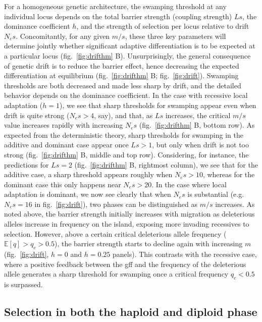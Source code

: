 \documentclass[
  11pt,
]{article}
\begin{document}
For a homogeneous genetic architecture, the swamping threshold at any
individual locus depends on the total barrier strength (coupling
strength) \(Ls\), the dominance coefficient \(h\), and the strength of
selection per locus relative to drift \(N_es\). Concomitantly, for any
given \(m/s\), these three key parameters will determine jointly whether
significant adaptive differentiation is to be expected at a particular
locus (fig.~\ref{fig:drifthm} B). Unsurprisingly, the general
consequence of genetic drift is to reduce the barrier effect, hence
decreasing the expected differentiation at equilibrium
(fig.~\ref{fig:drifthm} B; fig.~\ref{fig:drift}). Swamping thresholds
are both decreased and made less sharp by drift, and the detailed
behavior depends on the dominance coefficient. In the case with
recessive local adaptation (\(h=1\)), we see that sharp thresholds for
swamping appear even when drift is quite strong (\(N_es > 4\), say), and
that, as \(Ls\) increases, the critical \(m/s\) value increases rapidly
with increasing \(N_es\) (fig.~\ref{fig:drifthm} B, bottom row). As
expected from the deterministic theory, sharp thresholds for swamping in
the additive and dominant case appear once \(Ls > 1\), but only when
drift is not too strong (fig.~\ref{fig:drifthm} B, middle and top row).
Considering, for instance, the predictions for \(Ls = 2\)
(fig.~\ref{fig:drifthm} B, rightmost column), we see that for the
additive case, a sharp threshold appears roughly when \(N_es > 10\),
whereas for the dominant case this only happens near \(N_es > 20\). In
the case where local adaptation is dominant, we now see clearly that
when \(N_es\) is substantial (e.g.~\(N_es=16\) in fig.~\ref{fig:drift}),
two phases can be distinguished as \(m/s\) increases. As noted above,
the barrier strength initially increases with migration as deleterious
alleles increase in frequency on the island, exposing more invading
recessives to selection. However, above a certain critical deleterious
allele frequency (\(\mathbb{E}[q]>q_c>0.5\)), the barrier strength
starts to decline again with increasing \(m\) (fig.~\ref{fig:drift},
\(h=0\) and \(h=0.25\) panels). This contrasts with the recessive case,
where a positive feedback between the gff and the frequency of the
deleterious allele generates a sharp threshold for swamping once a
critical frequency \(q_c<0.5\) is surpassed.

\hypertarget{selection-in-both-the-haploid-and-diploid-phase}{%
\subsection{Selection in both the haploid and diploid
phase}\label{selection-in-both-the-haploid-and-diploid-phase}}
\end{document}
